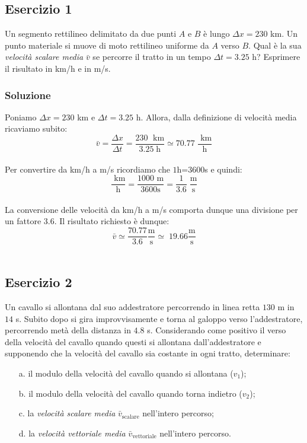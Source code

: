 \documentclass[12pt,a4paper]{book}
\begin{document}
\subsection*{Esercizio 1}
Un segmento rettilineo delimitato da due punti $A$ e $B$ è lungo $\Delta x=230$ km. Un punto materiale  si muove di moto rettilineo uniforme da $A$ verso $B$.  Qual è la sua \textit{velocità scalare media} $\bar{v}$  se percorre il tratto in un tempo $\Delta t =3.25$ h? Esprimere il risultato in km/h e in m/s.
 
\subsubsection*{Soluzione}
Poniamo $\Delta x = 230$ km e $\Delta t = 3.25$ h. Allora, dalla definizione di velocità media ricaviamo subito:
\begin{equation*}
\bar{v}= \frac{\Delta x}{\Delta t}=\frac{230 \;\text{ km}}{3.25 \; \text{h}}\simeq 70.77\;  \frac{\text{ km}}{\text{h}}
\end{equation*}\\
Per convertire da km/h a m/s ricordiamo che $1$h=$3600$s e quindi:
\begin{equation*}
\frac{\text{ km}}{\text{h}}=\frac{1000 \text{ m}}{3600\text{s}}=\frac{1}{3.6}\;\frac{\text{m}}{\text{s}}
\end{equation*}\\
La conversione delle velocità da km/h a m/s comporta dunque una divisione per un fattore 3.6. Il risultato richiesto è dunque:\\
\begin{equation*}
\bar{v}\simeq \frac{70.77}{3.6} \frac{\text{m}}{\text{s}} \simeq \;   19.66 \frac{\text{m}}{\text{s}}
\end{equation*}\\

\subsection*{Esercizio 2}
Un cavallo si allontana dal suo addestratore percorrendo in linea retta $130$ m in $14$ s. Subito dopo si gira improvvisamente e torna al galoppo verso l'addestratore, percorrendo metà della distanza in $4.8$ s. Considerando come positivo il verso della velocità del cavallo quando questi si allontana dall'addestratore
e supponendo che la velocità del cavallo sia costante in ogni tratto, determinare:
\begin{enumerate}
\item[a.]{il modulo della velocità del cavallo quando si allontana ($v_1$);}
\item[b.]{il modulo della velocità del cavallo quando torna indietro ($v_2$);}
\item[c.]{la \textit{velocità scalare media} $\bar{v}_{\text{scalare}}$ nell'intero percorso;}
\item[d.]{la \textit{velocità vettoriale media} $\bar{v}_{\text{vettoriale}}$ nell’intero percorso.}
\end{enumerate}
\end{document}
